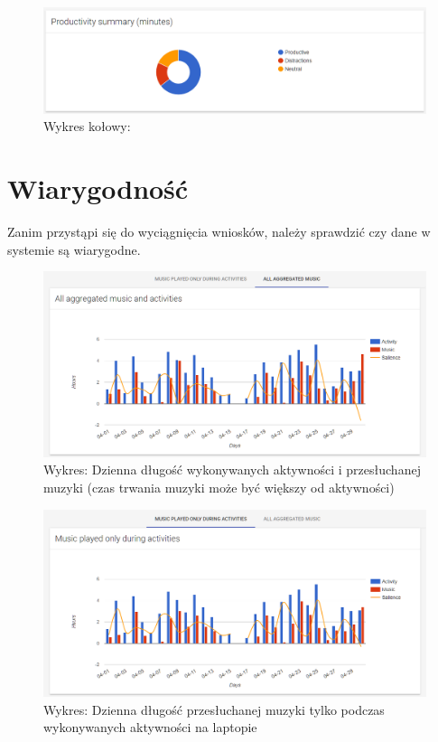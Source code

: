 \documentclass[openright]{xmgr}
\begin{document}
    \begin{figure}
        \includegraphics[width=\linewidth]{fig/ui/chart-productivity-summary.png}
        \caption{Wykres kołowy: }
        \label{fig:ui:chart-productivity-summary}
    \end{figure}

    \section{Wiarygodność}

    Zanim przystąpi się do wyciągnięcia wniosków, należy sprawdzić czy dane w systemie są wiarygodne.

    \begin{figure}
        \includegraphics[width=\linewidth]{fig/ui/chart-music-all.png}
        \caption{Wykres: Dzienna długość wykonywanych aktywności i przesłuchanej muzyki (czas trwania muzyki może być większy od aktywności)}
        \label{fig:ui:chart-music-all}
    \end{figure}

    \begin{figure}
        \includegraphics[width=\linewidth]{fig/ui/chart-music-only-during-activities.png}
        \caption{Wykres: Dzienna długość przesłuchanej muzyki tylko podczas wykonywanych aktywności na laptopie}
        \label{fig:ui:chart-music-only-during-activities}
    \end{figure}
\end{document}
